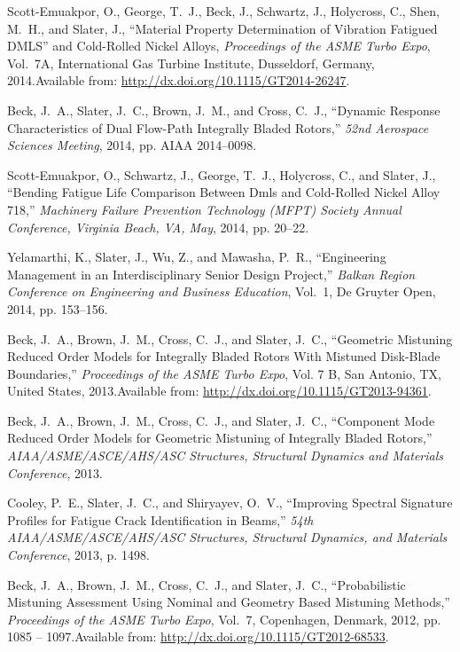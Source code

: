 Scott-Emuakpor, O., George, T.~J., Beck, J., Schwartz, J., Holycross, C., Shen,  M.~H., and Slater, J., ``Material Property Determination of Vibration  Fatigued {DMLS'' and Cold-Rolled Nickel Alloys,} \emph{ Proceedings of the ASME  Turbo Expo\/}, Vol.~7A, International Gas Turbine Institute, Dusseldorf,  Germany, 2014.\newblock Available from: \url{http://dx.doi.org/10.1115/GT2014-26247}.

Beck, J.~A., Slater, J.~C., Brown, J.~M., and Cross, C.~J., ``Dynamic  Response Characteristics of Dual Flow-Path Integrally Bladed Rotors,'' \emph{  52nd Aerospace Sciences Meeting\/}, 2014, pp. AIAA 2014--0098.

Scott-Emuakpor, O., Schwartz, J., George, T.~J., Holycross, C., and Slater, J.,  ``Bending Fatigue Life Comparison Between Dmls and Cold-Rolled Nickel  Alloy 718,'' \emph{ Machinery Failure Prevention Technology (MFPT) Society  Annual Conference, Virginia Beach, VA, May\/}, 2014, pp. 20--22.

Yelamarthi, K., Slater, J., Wu, Z., and Mawasha, P.~R., ``Engineering  Management in an Interdisciplinary Senior Design Project,'' \emph{ Balkan Region  Conference on Engineering and Business Education\/}, Vol.~1, De Gruyter Open,  2014, pp. 153--156.

Beck, J.~A., Brown, J.~M., Cross, C.~J., and Slater, J.~C., ``Geometric  Mistuning Reduced Order Models for Integrally Bladed Rotors With Mistuned  Disk-Blade Boundaries,'' \emph{ Proceedings of the ASME Turbo Expo\/}, Vol. 7 B,  {San Antonio, TX, United States}, 2013.\newblock Available from: \url{http://dx.doi.org/10.1115/GT2013-94361}.

Beck, J.~A., Brown, J.~M., Cross, C.~J., and Slater, J.~C., ``Component  Mode Reduced Order Models for Geometric Mistuning of Integrally Bladed  Rotors,'' \emph{  AIAA/\linebreak[1]ASME/\linebreak[1]ASCE/\linebreak[1]AHS/\linebreak[1]ASC  Structures, Structural Dynamics and Materials Conference\/}, 2013.

Cooley, P.~E., Slater, J.~C., and Shiryayev, O.~V., ``Improving Spectral  Signature Profiles for Fatigue Crack Identification in Beams,'' \emph{ 54th  AIAA/ASME/ASCE/AHS/ASC Structures, Structural Dynamics, and Materials  Conference\/}, 2013, p. 1498.

Beck, J.~A., Brown, J.~M., Cross, C.~J., and Slater, J.~C.,  ``Probabilistic Mistuning Assessment Using Nominal and Geometry Based  Mistuning Methods,'' \emph{ Proceedings of the ASME Turbo Expo\/}, Vol.~7,  Copenhagen, Denmark, 2012, pp. 1085 -- 1097.\newblock Available from: \url{http://dx.doi.org/10.1115/GT2012-68533}.

